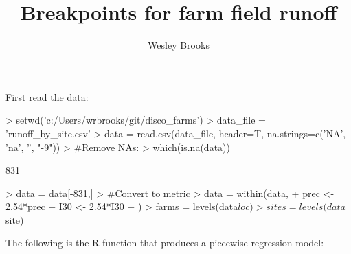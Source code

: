 \documentclass[12pt]{article}
\title{Breakpoints for farm field runoff}
\author{Wesley Brooks}
\date{}                                           %
\begin{document}
\maketitle

First read the data:
\vspace{3mm}

\begin{Schunk}
\begin{Sinput}
> setwd('c:/Users/wrbrooks/git/disco_farms')
> data_file = 'runoff_by_site.csv'
> data = read.csv(data_file, header=T, na.strings=c('NA', 'na', '', "-9"))
> #Remove NAs:
> which(is.na(data)) %
\end{Sinput}
\begin{Soutput}
[1] 831
\end{Soutput}
\begin{Sinput}
> data = data[-831,]
> #Convert to metric
> data = within(data, {
+     prec <- 2.54*prec
+     I30 <- 2.54*I30
+     })
> farms = levels(data$loc)
> sites = levels(data$site)
\end{Sinput}
\end{Schunk}

\vspace{5mm}

The following is the R function that produces a piecewise regression model:
\end{document}
